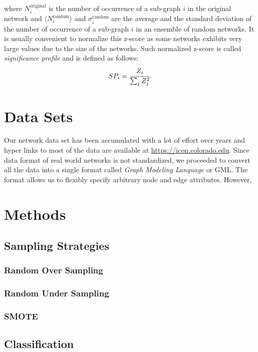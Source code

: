 \documentclass{article}
\begin{document}
where $N_i^{\text{original}}$ is the number of occurrence of a sub-graph $i$ in the original network and $ \langle N_i^{\text{random}} \rangle$ and $\sigma_i^{\text{random}}$ are the average and the standard deviation of the number of occurrence of a sub-graph $i$ in an ensemble of random networks. It is usually convenient to normalize this z-score as some networks exhibits very large values due to the size of the networks. Such normalized z-score is called \textit{significance profile} and is defined as follows:
	\begin{equation}
	SP_i = \cfrac{Z_i}{\sum_j Z_j^2}.
	\end{equation}

\section{Data Sets}
	
	Our network data set has been accumulated with a lot of effort over years and hyper links to most of the data are available at \url{https://icon.colorado.edu}.
	Since data format of real world networks is not standardized, we proceeded to convert all the data into a single format called \textit{Graph Modeling Language} or GML. The format allows us to flexibly specify arbitrary node and edge attributes. However, 
	
	

\section{Methods}

	\subsection{Sampling Strategies}
		\subsubsection{Random Over Sampling}
		\subsubsection{Random Under Sampling}
		\subsubsection{SMOTE}
	
	\subsection{Classification}
\end{document}
